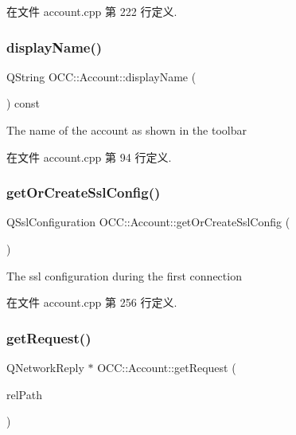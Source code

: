 在文件 account.\+cpp 第 222 行定义.

\mbox{\label{class_o_c_c_1_1_account_abad900771de98bbb53fc935774787d4b}} 
\subsubsection{\texorpdfstring{display\+Name()}{displayName()}}
{\footnotesize\ttfamily Q\+String O\+C\+C\+::\+Account\+::display\+Name (\begin{DoxyParamCaption}{ }\end{DoxyParamCaption}) const}



The name of the account as shown in the toolbar 



在文件 account.\+cpp 第 94 行定义.

\mbox{\label{class_o_c_c_1_1_account_ae8a4dddc3d6d2be239615d4eb9a3a668}} 
\subsubsection{\texorpdfstring{get\+Or\+Create\+Ssl\+Config()}{getOrCreateSslConfig()}}
{\footnotesize\ttfamily Q\+Ssl\+Configuration O\+C\+C\+::\+Account\+::get\+Or\+Create\+Ssl\+Config (\begin{DoxyParamCaption}{ }\end{DoxyParamCaption})}

The ssl configuration during the first connection 

在文件 account.\+cpp 第 256 行定义.

\mbox{\label{class_o_c_c_1_1_account_a6fb969819f685c52d74cbc00d463dd64}} 
\subsubsection{\texorpdfstring{get\+Request()}{getRequest()}\hspace{0.1cm}{\footnotesize\ttfamily [1/2]}}
{\footnotesize\ttfamily Q\+Network\+Reply $\ast$ O\+C\+C\+::\+Account\+::get\+Request (\begin{DoxyParamCaption}\item[{const Q\+String \&}]{rel\+Path }\end{DoxyParamCaption})}



